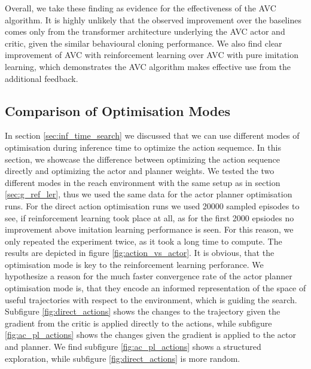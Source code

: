 Overall, we take these finding as evidence for the effectiveness of the AVC algorithm. It is highly unlikely that the observed improvement
over the baselines comes only from the transformer architecture underlying the AVC actor and critic, given the similar behavioural cloning performance. We also find clear improvement of AVC with
reinforcement learning over AVC with pure imitation learning, which demonstrates the AVC algorithm makes effective use from the additional feedback. 

\subsection{Comparison of Optimisation Modes}
\label{ref:com_opt_modes}
In section \ref{sec:inf_time_search} we discussed that we can use different modes of optimisation during inference time to optimize the action sequemce. In this section, 
we showcase the difference between optimizing the action sequence directly and optimizing the actor and planner weights. We tested the two different 
modes in the reach environment with the same setup as in section \ref{sec:g_ref_ler}, thus we used the same data for the actor planner optimisation runs. For the direct 
action optimisation runs we used 20000 sampled episodes to see, if reinforcement learning took place at all, as for the first 2000 epsiodes no improvement above 
imitation learning performance is seen. For this reason, we only repeated the experiment twice, as it took a long time to compute. The results are depicted in figure 
\ref{fig:action_vs_actor}. It is obvious, that the optimisation mode is key to the reinforcement learning perforance. We hypothesize a reason for the much 
faster convergence rate of the actor planner optimisation mode is, that they encode an informed representation of the space of useful trajectories with 
respect to the environment, which is guiding the search. Subfigure \ref{fig:direct_actions} shows the changes to the trajectory given the gradient from the critic is applied 
directly to the actions, while subfigure \ref{fig:ac_pl_actions} shows the changes given the gradient is applied to the actor and planner. We find 
subfigure \ref{fig:ac_pl_actions} shows a structured exploration, while subfigure \ref{fig:direct_actions} is more random. 

